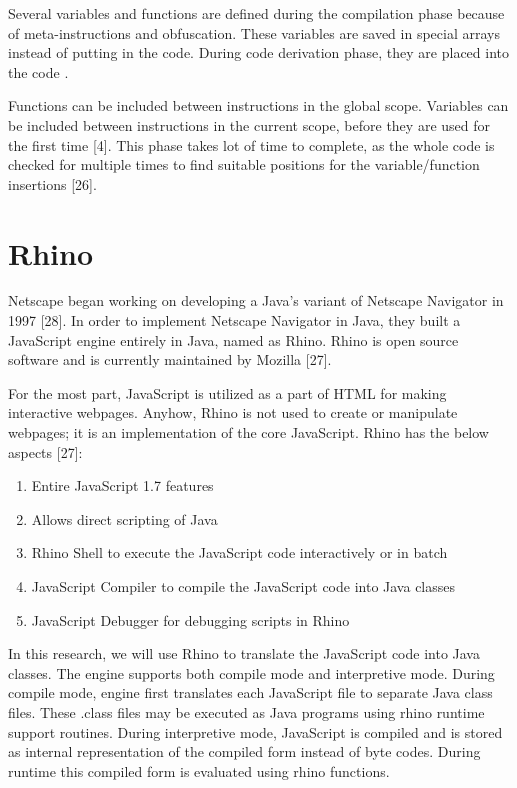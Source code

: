 Several variables and functions are defined during the compilation phase because of meta-instructions and obfuscation. These variables are saved in special arrays instead of putting in the code. During code derivation phase, they are placed into the code .

Functions can be included between instructions in the global scope. Variables can be included between instructions in the current scope, before they are used for the first time [4]. This phase takes lot of time to complete, as the whole code is checked for multiple times to find suitable positions for the variable/function insertions [26].


\section{Rhino}

Netscape began working on developing a Java’s variant of Netscape Navigator in 1997 [28]. In order to implement Netscape Navigator in Java, they built a JavaScript engine entirely in Java, named as Rhino. Rhino is open source software and is currently maintained by Mozilla [27].

For the most part, JavaScript is utilized as a part of HTML for making interactive webpages. Anyhow, Rhino is not used to create or manipulate webpages; it is an implementation of the core JavaScript. Rhino has the below aspects [27]:

\begin{enumerate}
\item Entire JavaScript 1.7 features
\item Allows direct scripting of Java
\item Rhino Shell to execute the JavaScript code interactively or in batch
\item JavaScript Compiler to compile the JavaScript code into Java classes
\item JavaScript Debugger for debugging scripts in Rhino
\end{enumerate}
 
In this research, we will use Rhino to translate the JavaScript code into Java classes. The engine supports both compile mode and interpretive mode. During compile mode, engine first translates each JavaScript file to separate Java class files. These .class files may be executed as Java programs using rhino runtime support routines. During interpretive mode, JavaScript is compiled and is stored as internal representation of the compiled form instead of byte codes. During runtime this compiled form is evaluated using rhino functions.

